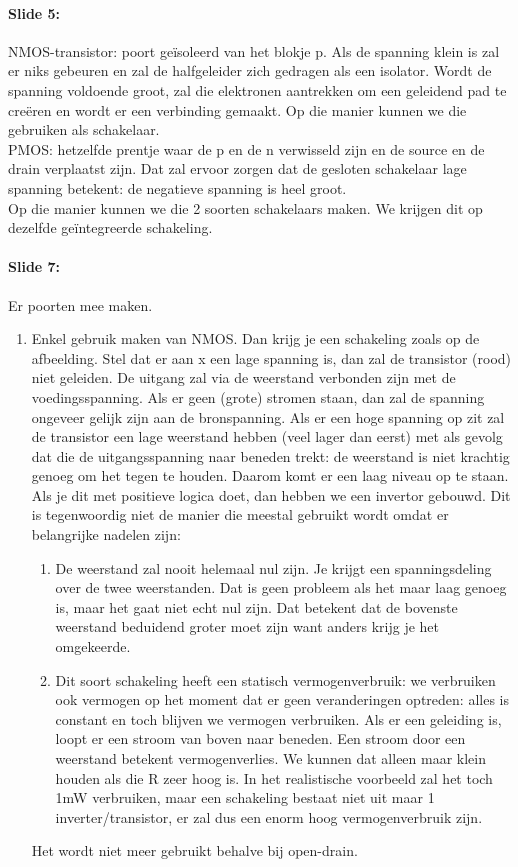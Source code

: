 \documentclass[10pt,a4paper]{book}
\begin{document}
\paragraph{Slide 5:} NMOS-transistor: poort ge\"isoleerd van het blokje p. Als de spanning klein is zal er niks gebeuren en zal de halfgeleider zich gedragen als een isolator. Wordt de spanning voldoende groot, zal die elektronen aantrekken om een geleidend pad te cre\"eren en wordt er een verbinding gemaakt. Op die manier kunnen we die gebruiken als schakelaar.\\
PMOS: hetzelfde prentje waar de p en de n verwisseld zijn en de source en de drain verplaatst zijn. Dat zal ervoor zorgen dat de gesloten schakelaar lage spanning betekent: de negatieve spanning is heel groot. \\
Op die manier kunnen we die 2 soorten schakelaars maken. We krijgen dit op dezelfde ge\"integreerde schakeling.

\paragraph{Slide 7:} Er poorten mee maken. 
\begin{enumerate}
\item Enkel gebruik maken van NMOS. Dan krijg je een schakeling zoals op de afbeelding. Stel dat er aan x een lage spanning is, dan zal de transistor (rood) niet geleiden. De uitgang zal via de weerstand verbonden zijn met de voedingsspanning. Als er geen (grote) stromen staan, dan zal de spanning ongeveer gelijk zijn aan de bronspanning. Als er een hoge spanning op zit zal de transistor een lage weerstand hebben (veel lager dan eerst) met als gevolg dat die de uitgangsspanning naar beneden trekt: de weerstand is niet krachtig genoeg om het tegen te houden.  Daarom komt er een laag niveau op te staan. Als je dit met positieve logica doet, dan hebben we een invertor gebouwd. Dit is tegenwoordig niet de manier die meestal gebruikt wordt omdat er belangrijke nadelen zijn: 
\begin{enumerate}
\item De weerstand zal nooit helemaal nul zijn. Je krijgt een spanningsdeling over de twee weerstanden. Dat is geen probleem als het maar laag genoeg is, maar het gaat niet echt nul zijn. Dat betekent dat de bovenste weerstand beduidend groter moet zijn want anders krijg je het omgekeerde.
\item Dit soort schakeling heeft een statisch vermogenverbruik: we verbruiken ook vermogen op het moment dat er geen veranderingen optreden: alles is constant en toch blijven we vermogen verbruiken. Als er een geleiding is, loopt er een stroom van boven naar beneden. Een stroom door een weerstand betekent vermogenverlies. We kunnen dat alleen maar klein houden als die R zeer hoog is. In het realistische voorbeeld zal het toch 1mW verbruiken, maar een schakeling bestaat niet uit maar 1 inverter/transistor, er zal dus een enorm hoog vermogenverbruik zijn. 
\end{enumerate}
Het wordt niet meer gebruikt behalve bij open-drain.
\end{enumerate}
\end{document}
